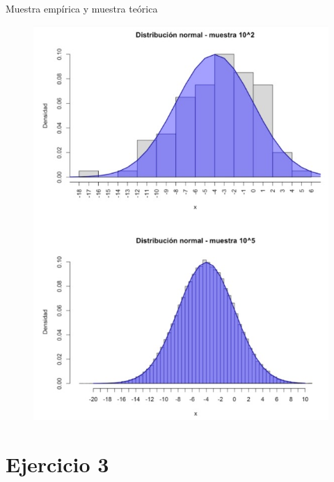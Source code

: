 \documentclass{beamer}
\begin{document}
\begin{frame}{Muestra empírica y muestra teórica}
\begin{figure}[htpb]
        \begin{center}
            \includegraphics[width=0.5\linewidth]{pic/ej2_gauss.jpeg}
        \end{center}
    \end{figure}
    
\end{frame}

\section{Ejercicio 3}
\end{document}
